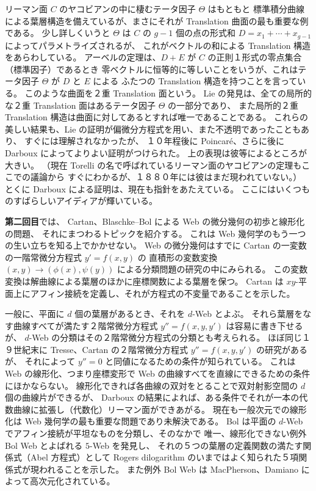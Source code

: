 \documentclass[uplatex,dvipdfmx]{jlreq}
\begin{document}
リーマン面 $C$ のヤコビアンの中に棲むテータ因子 $\Theta$ はもともと
標準積分曲線による葉層構造を備えているが、まさにそれが Translation 曲面の最も重要な例である。
少し詳しくいうと $\Theta$ は $C$ の $g-1$ 個の点の形式和
$D = x_1 + \cdots + x_{g-1}$ によってパラメトライズされるが、
これがベクトルの和による Translation 構造をあらわしている。
アーベルの定理は、$D + E$ が $C$ の正則１形式の零点集合（標準因子）であるとき
零ベクトルに恒等的に等しいことをいうが、これはテータ因子 $\Theta$ が $D$ と $E$ による
ふたつの Translation 構造を持つことを言っている。
このような曲面を２重 Translation 面という。
Lie の発見は、全ての局所的な２重 Translation 面はあるテータ因子 $\Theta$ の一部分であり、
また局所的２重 Translation 構造は曲面に対してあるとすれば唯一であることである。
これらの美しい結果も、Lie の証明が偏微分方程式を用い、また不透明であったこともあり、
すぐには理解されなかったが、
１０年程後に Poincaré、さらに後に Darboux によってよりよい証明がつけられた。
上の表現は彼等によるところが大きい。
（現在 Torelli の名で呼ばれているリーマン面のヤコビアンの定理もここでの議論から
すぐにわかるが、１８８０年には彼はまだ現われていない。）
とくに Darboux による証明は、現在も指針をあたえている。
ここにはいくつものすばらしいアイディアが輝いている。

\bigskip

\noindent\textbf{第二回目}では、
Cartan、Blaschke--Bol による Web の微分幾何の初歩と線形化の問題、
それにまつわるトピックを紹介する。
これは Web 幾何学のもう一つの生い立ちを知る上でかかせない。
Web の微分幾何はすでに Cartan の一変数の一階常微分方程式 $y' = f(x,y)$ の
直積形の変数変換 $(x,y) \to (\phi(x), \psi(y))$ による分類問題の研究の中にみられる。
この変数変換は解曲線による葉層のほかに座標関数による葉層を保つ。
Cartan は $xy$-平面上にアフィン接続を定義し、それが方程式の不変量であることを示した。

一般に、平面に $d$ 個の葉層があるとき、それを $d$-Web とよぶ。
それら葉層をなす曲線すべてが満たす２階常微分方程式 $y'' = f(x,y,y')$ は容易に書き下せるが、
$d$-Web の分類はその２階常微分方程式の分類とも考えられる。
ほぼ同じ１９世紀末に Tresse、Cartan の２階常微分方程式 $y'' = f(x,y,y')$ の研究があるが、
それによって $y'' = 0$ と同値になるための条件が知られている。
これは Web の線形化、つまり座標変形で Web の曲線すべてを直線にできるための条件にほかならない。
線形化できれば各曲線の双対をとることで双対射影空間の $d$ 個の曲線片ができるが、
Darboux の結果によれば、ある条件でそれが一本の代数曲線に拡張し（代数化）リーマン面ができあがる。
現在も一般次元での線形化は Web 幾何学の最も重要な問題であり未解決である。
Bol は平面の $d$-Web でアフィン接続が平坦なものを分類し、そのなかで
唯一、線形化できない例外 Bol Web とよばれる $5$-Web を発見し、
それの５つの葉層の定義関数の満たす関係式（Abel 方程式）として
Rogers dilogarithm のいまではよく知られた５項関係式が現われることを示した。
また例外 Bol Web は MacPherson、Damiano によって高次元化されている。
\end{document}
